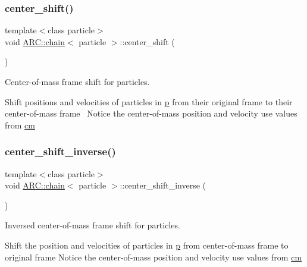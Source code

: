 \subsubsection{\texorpdfstring{center\+\_\+shift()}{center\_shift()}}
{\footnotesize\ttfamily template$<$class particle$>$ \\
void \hyperlink{classARC_1_1chain}{A\+R\+C\+::chain}$<$ particle $>$\+::center\+\_\+shift (\begin{DoxyParamCaption}{ }\end{DoxyParamCaption})\hspace{0.3cm}{\ttfamily [inline]}}



Center-\/of-\/mass frame shift for particles. 

Shift positions and velocities of particles in \hyperlink{classARC_1_1chain_af1793b656e139e1f87c2e0a55f87514b}{p} from their original frame to their center-\/of-\/mass frame~\newline
Notice the center-\/of-\/mass position and velocity use values from \hyperlink{classARC_1_1chain_ae9f6a5cbf7aac2b33c7274e7e10916ed}{cm} \hypertarget{classARC_1_1chain_a52edc1843550578f5be5590b7403ef97}{}\label{classARC_1_1chain_a52edc1843550578f5be5590b7403ef97} 
\subsubsection{\texorpdfstring{center\+\_\+shift\+\_\+inverse()}{center\_shift\_inverse()}}
{\footnotesize\ttfamily template$<$class particle$>$ \\
void \hyperlink{classARC_1_1chain}{A\+R\+C\+::chain}$<$ particle $>$\+::center\+\_\+shift\+\_\+inverse (\begin{DoxyParamCaption}{ }\end{DoxyParamCaption})\hspace{0.3cm}{\ttfamily [inline]}}



Inversed center-\/of-\/mass frame shift for particles. 

Shift the position and velocities of particles in \hyperlink{classARC_1_1chain_af1793b656e139e1f87c2e0a55f87514b}{p} from center-\/of-\/mass frame to original frame Notice the center-\/of-\/mass position and velocity use values from \hyperlink{classARC_1_1chain_ae9f6a5cbf7aac2b33c7274e7e10916ed}{cm} \hypertarget{classARC_1_1chain_a5299fa50788dc7e5d15504c33f76333f}{}\label{classARC_1_1chain_a5299fa50788dc7e5d15504c33f76333f} 
